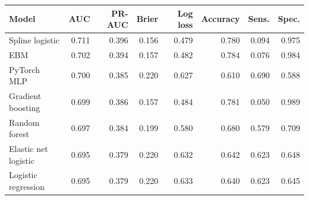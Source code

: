 \begin{tabular}{lrrrrrrr}
\toprule
Model & AUC & PR-AUC & Brier & Log loss & Accuracy & Sens. & Spec. \\
\midrule
Spline logistic & 0.711 & 0.396 & 0.156 & 0.479 & 0.780 & 0.094 & 0.975 \\
EBM & 0.702 & 0.394 & 0.157 & 0.482 & 0.784 & 0.076 & 0.984 \\
PyTorch MLP & 0.700 & 0.385 & 0.220 & 0.627 & 0.610 & 0.690 & 0.588 \\
Gradient boosting & 0.699 & 0.386 & 0.157 & 0.484 & 0.781 & 0.050 & 0.989 \\
Random forest & 0.697 & 0.384 & 0.199 & 0.580 & 0.680 & 0.579 & 0.709 \\
Elastic net logistic & 0.695 & 0.379 & 0.220 & 0.632 & 0.642 & 0.623 & 0.648 \\
Logistic regression & 0.695 & 0.379 & 0.220 & 0.633 & 0.640 & 0.623 & 0.645 \\
\bottomrule
\end{tabular}